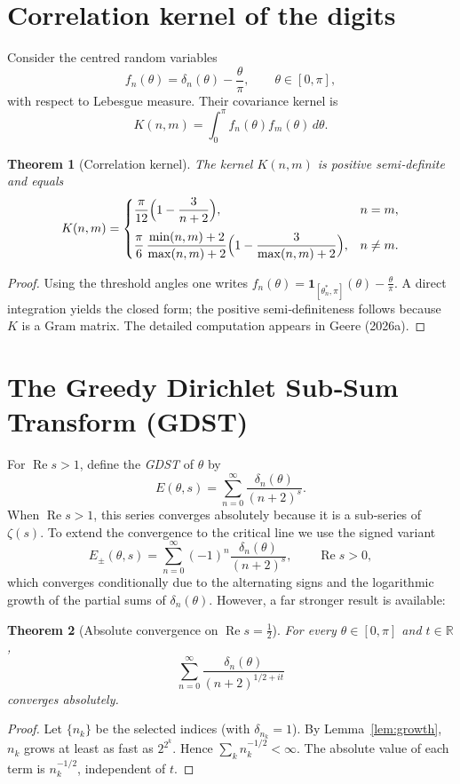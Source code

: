 \documentclass[12pt,a4paper]{article}
\newtheorem{theorem}{Theorem}[section]
\theoremstyle{remark}
\begin{document}
\section{Correlation kernel of the digits}
\label{sec:correlation}

Consider the centred random variables
\[
f_n(\theta)=\delta_n(\theta)-\frac{\theta}{\pi},\qquad \theta\in[0,\pi],
\]
with respect to Lebesgue measure.
Their covariance kernel is
\[
K(n,m)=\int_0^\pi f_n(\theta)f_m(\theta)\,d\theta .
\]

\begin{theorem}[Correlation kernel]\label{thm:kernel}
The kernel $K(n,m)$ is positive semi‑definite and equals
\[
K(n,m)=
\begin{cases}
\dfrac{\pi}{12}\Bigl(1-\dfrac{3}{n+2}\Bigr), & n=m,\\[10pt]
\dfrac{\pi}{6}\,\dfrac{\min(n,m)+2}{\max(n,m)+2}
\Bigl(1-\dfrac{3}{\max(n,m)+2}\Bigr), & n\neq m .
\end{cases}
\]
\end{theorem}
\begin{proof}
Using the threshold angles one writes $f_n(\theta)=\mathbf{1}_{[\theta_n^*,\pi]}(\theta)-\frac{\theta}{\pi}$.
A direct integration yields the closed form; the positive semi‑definiteness follows because $K$ is a Gram matrix.
The detailed computation appears in Geere (2026a).
\end{proof}

\section{The Greedy Dirichlet Sub‑Sum Transform (GDST)}
\label{sec:GDST}

For $\operatorname{Re}s>1$, define the \emph{GDST} of $\theta$ by
\begin{equation}\label{eq:Edir}
E(\theta,s)=\sum_{n=0}^\infty \frac{\delta_n(\theta)}{(n+2)^s}.
\end{equation}
When $\operatorname{Re}s>1$, this series converges absolutely because it is a sub‑series of $\zeta(s)$.
To extend the convergence to the critical line we use the signed variant
\[
E_\pm(\theta,s)=\sum_{n=0}^\infty (-1)^n\frac{\delta_n(\theta)}{(n+2)^s},
\qquad\operatorname{Re}s>0,
\]
which converges conditionally due to the alternating signs and the logarithmic growth of the partial sums of $\delta_n(\theta)$.
However, a far stronger result is available:

\begin{theorem}[Absolute convergence on $\operatorname{Re}s=\frac12$]\label{thm:absconv}
For every $\theta\in[0,\pi]$ and $t\in\mathbb R$,
\[
\sum_{n=0}^\infty \frac{\delta_n(\theta)}{(n+2)^{1/2+it}}
\]
converges absolutely.
\end{theorem}
\begin{proof}
Let $\{n_k\}$ be the selected indices (with $\delta_{n_k}=1$). By Lemma~\ref{lem:growth},
$n_k$ grows at least as fast as $2^{2^k}$.
Hence $\sum_{k} n_k^{-1/2} <\infty$.
The absolute value of each term is $n_k^{-1/2}$, independent of $t$.
\end{proof}
\end{document}

